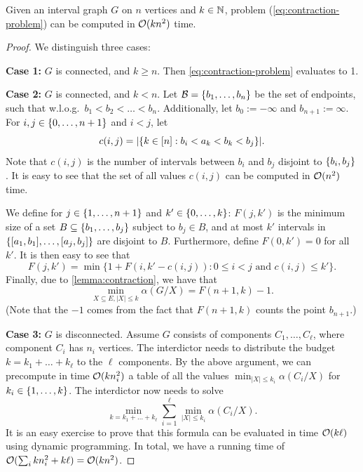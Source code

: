 \begin{theorem}
\label{thm:contraction-blocker}
Given an interval graph $G$ on $n$ vertices and $k \in \mathbb{N}$, problem (\ref{eq:contraction-problem}) can be computed in $\mathcal{O}(kn^2)$ time.
\end{theorem}
\begin{proof}
We distinguish three cases:

\textbf{Case 1:} $G$ is connected, and $k \geq n$. Then \cref{eq:contraction-problem} evaluates to 1.

\textbf{Case 2:} $G$ is connected, and $k < n$. Let $\mathcal{B} = \{ b_1, \ldots, b_n \}$ be the set of endpoints, such that w.l.o.g.\ $b_1 < b_2 < \dots < b_n$. Additionally, let $b_0 := -\infty$ and $b_{n+1} := \infty$. For $i,j \in \{ 0, \ldots, n+1 \}$ and $i < j$, let 
\[c(i, j) = |\{ k \in [n] : b_i < a_k < b_k < b_j \}|. \]
Note that $c(i, j)$ is the number of intervals between $b_i$ and $b_j$ disjoint to $\{ b_i, b_j \}$. It is easy to see that the set of all values $c(i,j)$ can be computed in $\mathcal{O}(n^2)$ time.


We define for $j \in \{ 1, \ldots, n+1 \}$ and $k' \in \{ 0, \ldots, k \}$:
$F(j, k')$ is the minimum size of a set $B \subseteq \{ b_1, \ldots, b_j \}$ subject to $b_j \in B$, and at most $k'$ intervals in $\{ [a_1,b_1], \ldots, [a_j, b_j] \}$ are disjoint to $B$. Furthermore, define $F(0, k') = 0$ for all $k'$. It is then easy to see that 
\begin{equation}
F(j,k') = \min \{ 1 + F(i, k'-c(i,j)) \colon 0 \leq i < j\text{ and } c(i,j) \leq k' \}.
\end{equation}  
Finally, due to \cref{lemma:contraction}, we have that 
\[\min_{X \subseteq E, |X| \leq k}\alpha(G/X) = F(n+1, k) - 1. \]
(Note that the $-1$ comes from the fact that $F(n+1, k)$ counts the point $b_{n+1}$.)

\textbf{Case 3:} $G$ is disconnected. Assume $G$ consists of  components $C_1, \dots, C_{\ell}$, where component $C_i$ has $n_i$ vertices. The interdictor needs to distribute the budget $k = k_1 + \dots + k_{\ell}$ to the $\ell$ components. By the above argument, we can precompute in time $\mathcal{O}(kn_i^2)$ a table of all the values $\min_{|X| \leq k_i} \alpha(C_i/X)$ for $k_i \in \{ 1, \ldots, k \}$. The interdictor now needs to solve 
\[ \min_{k = k_1 + \dots + k_{\ell}} \sum_{i=1}^{\ell} \min_{|X| \leq k_i} \alpha(C_i/X). \]
It is an easy exercise to prove that this formula can be evaluated in time $\mathcal{O}(k\ell)$ using dynamic programming. In total, we have a running time of $\mathcal{O}(\sum_i kn_i^2 + k\ell) = \mathcal{O}(kn^2)$.  
\end{proof}

